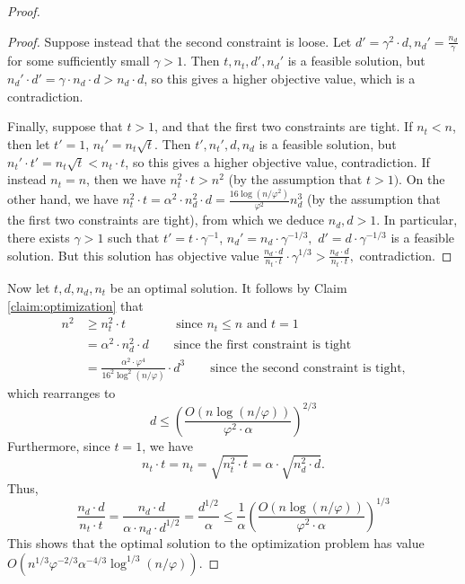 \documentclass[letterpaper,11pt]{article}
\theoremstyle{plain}
\theoremstyle{definition}
\theoremstyle{remark}
\begin{document}
\begin{proof}
\begin{proof}
Suppose instead that the second constraint is loose. Let $d' = \gamma^2 \cdot d, n_d' = \frac{n_d}{\gamma}$ for some sufficiently small $\gamma >1$. Then $t,n_t, d', n_d'$ is a feasible solution, but $n_d' \cdot d' = \gamma \cdot n_d \cdot d > n_d \cdot d$, so this gives a higher objective value, which is a contradiction. 

Finally, suppose that $t >1$, and that the first two constraints are tight. If $n_t < n$, then let $t' =1$, $n_t' = n_t \sqrt{t}$. Then $t', n_t', d, n_d$ is a feasible solution, but $n_t' \cdot t' =  n_t \sqrt{t} < n_t \cdot t$, so this gives a higher objective value, contradiction. If instead $n_t = n$, then we have 
$n_t^2 \cdot t > n^2$ (by the assumption that $t >1)$. On the other hand, we have $n_t^2 \cdot t = \alpha^2 \cdot n_d^2 \cdot d = \frac{16 \log(n/\varphi^2)}{\varphi^2}n_d^3$ (by the assumption that the first two constraints are tight), from which we deduce $n_d, d >1$. In particular, there exists $\gamma >1$ such that $t' = t \cdot \gamma^{-1}$, $n_d' =  n_d \cdot \gamma^{-1/3} , $ $d'  =  d\cdot \gamma^{-1/3}$ is a feasible solution. But this solution has objective value $\frac{n_d \cdot d}{n_t\cdot  t}\cdot \gamma^{1/3}>\frac{n_d \cdot d}{n_t\cdot  t},$ contradiction.  
\end{proof}
Now let $t,d,n_d, n_t$ be an optimal solution. It follows by Claim \ref{claim:optimization} that
\begin{align*}
     n^2  &\geq n_t^2\cdot t \qquad \qquad \text{since $n_t \leq n$ and $t = 1$} \\
     & = \alpha^2\cdot  n_d^2 \cdot d \qquad \text{since the first constraint is tight} \\
     &  = \frac{\alpha^2 \cdot \varphi^4}{16^2\log^2(n/\varphi)}\cdot d^3 \qquad \text{since the second constraint is tight,}
\end{align*}
which rearranges to 
\[d \leq \left( \frac{O(n \log(n/\varphi))}{\varphi^2 \cdot  \alpha} \right)^{2/3}\]
Furthermore, since $t=1$, we have
\[n_t \cdot t = n_t = \sqrt{n_t^2 \cdot t} = \alpha\cdot \sqrt{ n_d^2 \cdot d}.\]
Thus, 
\[ \frac{n_d \cdot d}{n_t \cdot t}  = \frac{n_d \cdot d}{ \alpha \cdot n_d \cdot d^{1/2}} = \frac{d^{1/2}}{\alpha} \leq \frac{1}{\alpha} \left( \frac{O(n \log(n/\varphi))}{ \varphi^2\cdot  \alpha}\right)^{1/3}  \]
This shows that the optimal solution to the optimization problem has value $O(n^{1/3} \varphi^{-2/3}\alpha^{-4/3} \log^{1/3}(n/\varphi)).$



\end{proof}
\end{document}

